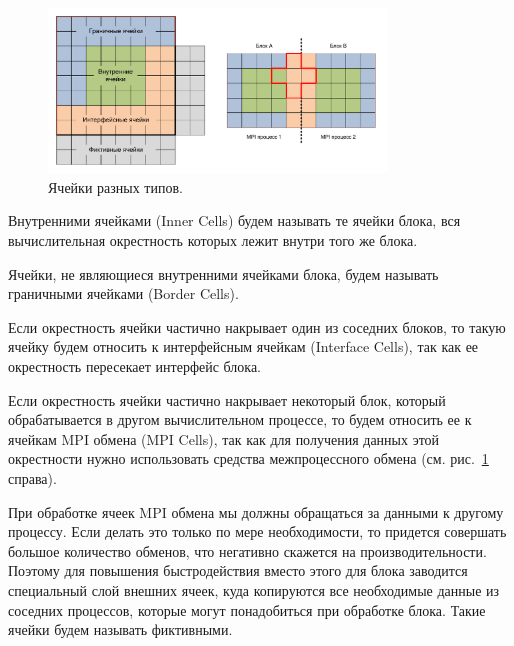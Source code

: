 \begin{figure}[ht]
\centering
\includegraphics[width=0.8\textwidth]{fig/par_4-block-cells.pdf}
\singlespacing
{}\caption{Ячейки разных типов.}
\label{fig:text_2_block_block_cells}
\end{figure}

\begin{definition}
Внутренними ячейками (Inner Cells) будем называть те ячейки блока, вся вычислительная окрестность которых лежит внутри того же блока.
\end{definition}

\begin{definition}
Ячейки, не являющиеся внутренними ячейками блока, будем называть граничными ячейками (Border Cells).
\end{definition}

\begin{definition}
Если окрестность ячейки частично накрывает один из соседних блоков, то такую ячейку будем относить к интерфейсным ячейкам (Interface Cells), так как ее окрестность пересекает интерфейс блока.
\end{definition}

\begin{definition}
Если окрестность ячейки частично накрывает некоторый блок, который обрабатывается в другом вычислительном процессе, то будем относить ее к ячейкам MPI\label{abbr:mpi-1} обмена (MPI Cells), так как для получения данных этой окрестности нужно использовать средства межпроцессного обмена (см. рис.~\ref{fig:text_2_block_block_cells} справа).
\end{definition}

При обработке ячеек MPI обмена мы должны обращаться за данными к другому процессу.
Если делать это только по мере необходимости, то придется совершать большое количество обменов, что негативно скажется на производительности.
Поэтому для повышения быстродействия вместо этого для блока заводится специальный слой внешних ячеек, куда копируются все необходимые данные из соседних процессов, которые могут понадобиться при обработке блока.
Такие ячейки будем называть фиктивными.

